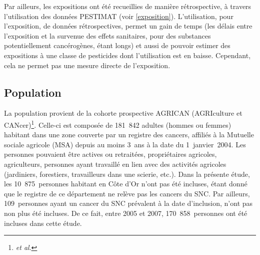 \documentclass[10pt,english,french]{article}
\begin{document}
Par ailleurs, les expositions ont été recueillies de manière rétrospective, à travers l'utilisation des données PESTIMAT (voir \ref{exposition}). L'utilisation, pour l'exposition, de données rétrospectives, permet un gain de temps (les délais entre l'exposition et la survenue des effets sanitaires, pour des substances potentiellement cancérogènes, étant longs) et aussi de pouvoir estimer des expositions à une classe de pesticides dont l'utilisation est en baisse. Cependant, cela ne permet pas une mesure directe de l'exposition. 

\subsection{Population}
La population provient de la cohorte prospective AGRICAN (AGRIculture et CANcer)\footnote{ \emph{et al}. }. Celle-ci est composée de 181~842 adultes (hommes ou femmes) habitant dans une zone couverte par un registre des cancers, affiliés à la Mutuelle sociale agricole (MSA) depuis au moins 3~ans à la date du 1~janvier~2004. Les personnes pouvaient être actives ou retraitées, propriétaires agricoles, agriculteurs, personnes ayant travaillé en lien avec des activités agricoles (jardiniers, forestiers, travailleurs dans une scierie, etc.). Dans la présente étude, les 10~875~personnes habitant en Côte d'Or n'ont pas été incluses, étant donné que le registre de ce département ne relève pas les cancers du SNC. Par ailleurs, 109~personnes ayant un cancer du SNC prévalent à la date d'inclusion, n'ont pas non plus été incluses. De ce fait, entre 2005 et 2007, 170~858~personnes ont été incluses dans cette étude.
\end{document}

